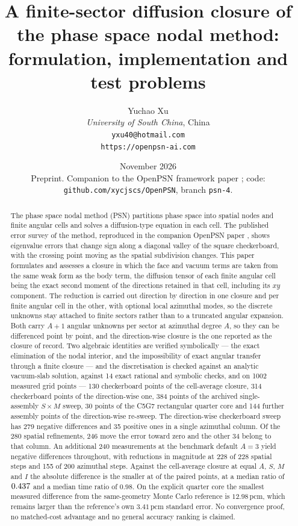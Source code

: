 \documentclass[11pt,a4paper]{article}
\title{\bf A finite-sector diffusion closure of the phase space nodal method:
formulation, implementation and test problems}
\author{
  Yuchao Xu \\
  \textit{University of South China}, China \\
  \texttt{yxu40@hotmail.com} \\
  \texttt{https://openpsn-ai.com}
}
\date{November 2026\\[2pt]
  \small Preprint. Companion to the OpenPSN framework paper \cite{openpsn2026};
  code: \texttt{github.com/xycjscs/OpenPSN}, branch \texttt{psn-4}.}
\newcommand{\pcm}{\,\mathrm{pcm}}
\begin{document}
\maketitle

\begin{abstract}
The phase space nodal method (PSN) \cite{psn2027} partitions phase space into
spatial nodes and finite angular cells and solves a diffusion-type equation in
each cell. The published error survey of the method, reproduced in the companion
OpenPSN paper \cite{openpsn2026}, shows eigenvalue errors that change sign along
a diagonal valley of the square checkerboard, with the crossing point moving as
the spatial subdivision changes. This paper formulates and assesses a closure in
which the face and vacuum terms are taken from the same weak form as the body
term, the diffusion tensor of each finite angular cell being the exact second
moment of the directions retained in that cell, including its $xy$ component.
The reduction is carried out direction by direction in one closure and per finite
angular cell in the other, with optional local azimuthal modes, so the discrete
unknowns stay attached to finite sectors rather than to a truncated angular
expansion. Both carry $A{+}1$ angular unknowns per sector at azimuthal degree $A$, so
they can be differenced point by point, and the direction-wise closure is the one
reported as the closure of record. Two algebraic identities are verified symbolically
--- the exact elimination of the nodal interior, and the impossibility of exact angular
transfer through a finite closure --- and the discretisation is checked against an
analytic vacuum-slab solution, against 14 exact rational and symbolic checks, and on
1002 measured grid points --- 130 checkerboard points of the cell-average closure, 314
checkerboard points of the direction-wise one, 384 points of the archived
single-assembly $S\times M$ sweep, 30 points of the C5G7 rectangular quarter core and
144 further assembly points of the direction-wise re-sweep. The direction-wise
checkerboard sweep has 279 negative differences and 35 positive ones in a single
azimuthal column. Of the 280 spatial refinements, 246 move the error toward zero and
the other 34 belong to that column. An additional 240 measurements at the benchmark
default $A{=}3$ yield negative differences throughout, with reductions in magnitude at
228 of 228 spatial steps and 155 of 200 azimuthal steps. Against the
cell-average closure at equal $A$, $S$, $M$ and $I$ the absolute difference is
the smaller at \StudyFourSmaller{} of the \StudyFourPairs{} paired points, at a median ratio of $0.437$ and a median
time ratio of $0.98$. On the explicit quarter core the
smallest measured difference from the same-geometry Monte Carlo reference is
$12.98\pcm$, which remains larger than the reference's own $3.41\pcm$ standard
error. No convergence proof, no matched-cost advantage and no general accuracy
ranking is claimed.
\end{abstract}
\end{document}
